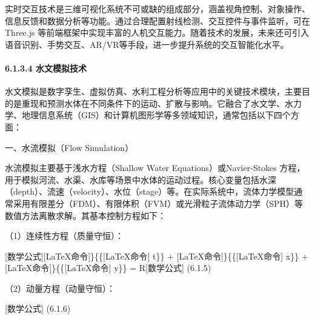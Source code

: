 \begin{Shaded}
\begin{Highlighting}[]
 \OperatorTok{\textgreater{}} \NormalTok{) \{}

\OperatorTok{=}\NormalTok{ intersects[}\NormalTok{]}\OperatorTok{;}

\OperatorTok{;}

\NormalTok{\}}

\NormalTok{\})}\OperatorTok{;}

\OperatorTok{,}\OperatorTok{;}

\NormalTok{\}}
\end{Highlighting}
\end{Shaded}

实时交互技术是三维可视化系统不可或缺的组成部分，涵盖视角控制、对象操作、信息反馈和数据分析等功能。通过合理配置射线检测、交互控件与事件监听，可在 Three.js 等前端框架中实现丰富的人机交互能力。随着技术的发展，未来还可引入语音识别、手势交互、AR/VR等手段，进一步提升系统的交互智能化水平。

\paragraph{6.1.3.4 水文模拟技术}\label{ux6c34ux6587ux6a21ux62dfux6280ux672f}

水文模拟是数字孪生、虚拟仿真、水利工程分析等应用中的关键技术模块，主要目的是重现和预测水体在不同条件下的运动、扩散与影响。它融合了水文学、水力学、地理信息系统（GIS）和计算机图形学等多领域知识，通常包括以下四个方面：

一、水流模拟（Flow Simulation）

水流模拟主要基于浅水方程（Shallow Water Equations）或Navier-Stokes 方程，用于模拟河流、水渠、水库等场景中水体的运动过程。核心变量包括水深（depth）、流速（velocity）、水位（stage）等。在实际系统中，流体力学模型通常采用有限差分（FDM）、有限体积（FVM）或光滑粒子流体动力学（SPH）等数值方法离散求解。其基本控制方程如下：

（1）连续性方程（质量守恒）：

{[}数学公式{]}{[}LaTeX命令{]}\}\{\{{[}LaTeX命令{]} t\}\} + {[}LaTeX命令{]}\}\{\{{[}LaTeX命令{]} x\}\} + {[}LaTeX命令{]}\}\{\{{[}LaTeX命令{]} y\}\} = R{[}数学公式{]} (6.1.5)

（2）动量方程（动量守恒）：

{[}数学公式{]} (6.1.6)

